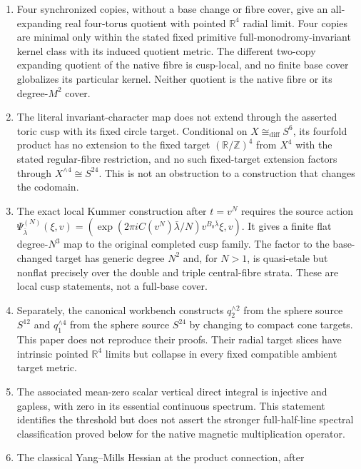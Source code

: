 \documentclass[11pt]{article}
\numberwithin{equation}{section}
\theoremstyle{definition}
\theoremstyle{remark}
\newcommand{\R}{\mathbb R}
\newcommand{\Z}{\mathbb Z}
\begin{document}
\begin{enumerate}[leftmargin=2.3em]
$-TD/\sqrt{T^2+m^2}$ and is
$T-b_{\mathrm I,0}+O(T^{-1})$ on the positive radial marked lift.  The
character is global; for the chosen radial fibre metrics its
Fourier mode gap-closes, but it need not be the exact shortest mode at every
parameter.
\item Four synchronized copies, without a base change or fibre cover, give an
all-expanding real four-torus quotient with pointed $\R^4$ radial limit.
Four copies are minimal only within the stated fixed primitive
full-monodromy-invariant kernel class with its induced quotient metric.  The
different two-copy expanding quotient of the native fibre is cusp-local, and
no finite base cover globalizes its particular kernel.  Neither quotient is
the native fibre or its degree-$M^2$ cover.
\item The literal invariant-character map does not extend through the
asserted toric cusp with its fixed circle target.  Conditional on
$X\cong_{\mathrm{diff}}S^6$, its fourfold product has no extension to the
fixed target $(\R/\Z)^4$ from $X^4$ with the stated regular-fibre restriction,
and no such fixed-target extension factors through
$X^{\wedge4}\cong S^{24}$.  This is not an obstruction to a construction
that changes the codomain.
\item The exact local Kummer construction after $t=v^N$ requires the source
action
$\Psi^{(N)}_{\bar\lambda}(\xi,v)=
(\exp(2\pi iC(v^N)\bar\lambda/N)v^{B_0\bar\lambda}\xi,v)$.
It gives a finite flat degree-$N^3$ map to the original completed cusp
family.  The factor to the base-changed target has generic degree $N^2$ and,
for $N>1$, is quasi-etale but nonflat precisely over the double and triple
central-fibre strata.  These are local cusp statements, not a full-base
cover.
\item Separately, the canonical workbench constructs
$q_2^{\wedge2}$ from the sphere source $S^{12}$ and $q_1^{\wedge4}$ from
the sphere source $S^{24}$ by changing to compact cone targets.  This paper
does not reproduce their proofs.  Their radial target slices have intrinsic
pointed $\R^4$ limits but collapse in every fixed compatible ambient target
metric.
\item The associated mean-zero scalar vertical direct integral is injective
and gapless, with zero in its essential continuous spectrum.  This statement
identifies the threshold but does not assert the stronger full-half-line
spectral classification proved below for the native magnetic multiplication
operator.
\item The classical Yang--Mills Hessian at the product connection, after

\end{enumerate}
\end{document}
